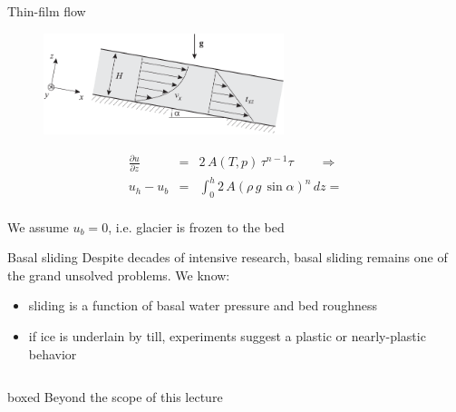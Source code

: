 \documentclass[hide notes,intlimits]{beamer}
\begin{document}
\begin{frame}{Thin-film flow}
  \begin{figure}
    \includegraphics[width=7cm]{figures/fig_3_11}
  \end{figure}
  \begin{equation*}
    \begin{array}{ccl}
      \frac{\partial u}{\partial z}  & = &  2\,A(T,p)\,\tau^{n-1}\tau \qquad \Rightarrow \\[1em]
      u_{h} - u_{b} &  = & \int_{0}^{h} 2\,A\left(\rho\,g\,\sin{\alpha}\right)^{n}\,dz =
    \end{array}
  \end{equation*}
  \\[.75em]
  We assume $u_b=0$, i.e. glacier is frozen to the bed
\end{frame}


\begin{frame}{Basal sliding}
  Despite decades of intensive research, basal sliding remains one of the grand unsolved problems. We know:
  \begin{itemize}
  \item sliding is a function of basal water pressure and bed roughness
  \item if ice is underlain by till, experiments suggest a plastic or nearly-plastic behavior
  \end{itemize}
  \vspace{1em}
  \begin{columns}
    \column[C]{7.5cm}
    \begin{beamercolorbox}[rounded=true,shadow=true]{boxed}
      Beyond the scope of this lecture
    \end{beamercolorbox}
  \end{columns}
\end{frame}

\end{document}
